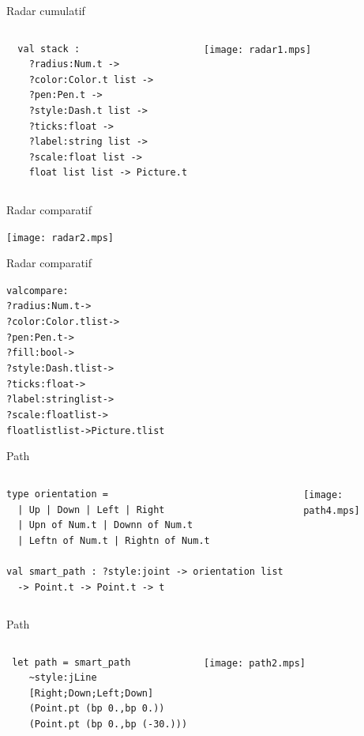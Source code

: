 \documentclass{beamer}
\begin{document}
\begin{frame}[fragile]{Radar cumulatif}
  \begin{columns}
\begin{verbatim}
  val stack :
    ?radius:Num.t ->
    ?color:Color.t list ->
    ?pen:Pen.t ->
    ?style:Dash.t list ->
    ?ticks:float ->
    ?label:string list ->
    ?scale:float list ->
    float list list -> Picture.t
\end{verbatim}
    \texttt{[image: radar1.mps]}
  \end{columns}
\end{frame}


\begin{frame}{Radar comparatif}
  \begin{center}
    \texttt{[image: radar2.mps]}
  \end{center}
\end{frame}

\begin{frame}[fragile]{Radar comparatif}
\begin{alltt}
  val compare :
    ?radius:Num.t ->
    ?color:Color.t list ->
    ?pen:Pen.t ->
    \color{red}?fill:bool ->
\color{black}    ?style:Dash.t list ->
    ?ticks:float ->
    ?label:string list ->
    ?scale:float list ->
    float list list -> Picture.t \color{red}list
\end{alltt}
\end{frame}


\begin{frame}[fragile]{Path}
  \begin{columns}
\begin{verbatim}
type orientation = 
  | Up | Down | Left | Right
  | Upn of Num.t | Downn of Num.t 
  | Leftn of Num.t | Rightn of Num.t
  
val smart_path : ?style:joint -> orientation list 
  -> Point.t -> Point.t -> t
\end{verbatim}
\texttt{[image: path4.mps]}
\end{columns}
\end{frame}

\begin{frame}[fragile]{Path}
  \begin{columns}
\begin{verbatim}
 let path = smart_path 
    ~style:jLine
    [Right;Down;Left;Down]
    (Point.pt (bp 0.,bp 0.)) 
    (Point.pt (bp 0.,bp (-30.)))
\end{verbatim}
    \texttt{[image: path2.mps]}
\end{columns}
\end{frame}
\end{document}
